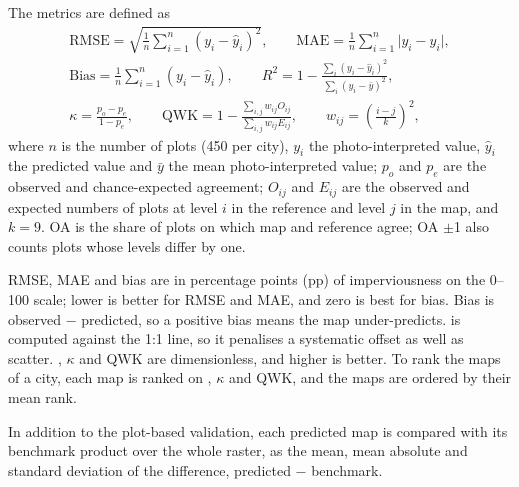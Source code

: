 The metrics are defined as
\begin{gather*}
  \mathrm{RMSE} = \sqrt{\frac{1}{n}\sum_{i=1}^{n}(y_i-\hat y_i)^2}, \qquad
  \mathrm{MAE} = \frac{1}{n}\sum_{i=1}^{n}\lvert y_i-\hat y_i\rvert, \\
  \mathrm{Bias} = \frac{1}{n}\sum_{i=1}^{n}(y_i-\hat y_i), \qquad
  R^2 = 1-\frac{\sum_i (y_i-\hat y_i)^2}{\sum_i (y_i-\bar y)^2}, \\
  \kappa = \frac{p_o-p_e}{1-p_e}, \qquad
  \mathrm{QWK} = 1-\frac{\sum_{i,j} w_{ij}O_{ij}}{\sum_{i,j} w_{ij}E_{ij}},
  \qquad w_{ij} = \left(\frac{i-j}{k}\right)^2,
\end{gather*}
where $n$ is the number of plots (450 per city), $y_i$ the photo-interpreted
value, $\hat y_i$ the predicted value and $\bar y$ the mean photo-interpreted
value; $p_o$ and $p_e$ are the observed and chance-expected agreement;
$O_{ij}$ and $E_{ij}$ are the observed and expected numbers of plots at level
$i$ in the reference and level $j$ in the map, and $k=9$. OA is the share of
plots on which map and reference agree; OA $\pm$1 also counts plots whose
levels differ by one.

RMSE, MAE and bias are in percentage points (pp) of imperviousness on the
0--100 scale; lower is better for RMSE and MAE, and zero is best for bias.
Bias is observed $-$ predicted, so a positive bias means the map
under-predicts. \Rsq{} is computed against the 1:1 line, so it penalises a
systematic offset as well as scatter. \Rsq, $\kappa$ and QWK are
dimensionless, and higher is better. To rank the maps of a city, each map is
ranked on \Rsq, $\kappa$ and QWK, and the maps are ordered by their mean
rank.

In addition to the plot-based validation, each predicted map is compared
with its benchmark product over the whole raster, as the mean, mean absolute
and standard deviation of the difference, predicted $-$ benchmark.
